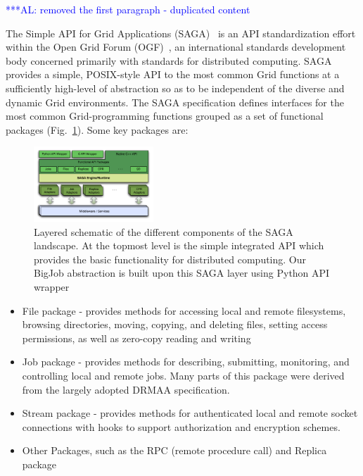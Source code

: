 \documentclass[conference,final]{IEEEtran}
\newcommand{\alnote}[1]{ {\textcolor{blue} { ***AL: #1 }}}
\newcommand{\alnote}[1]{}
\begin{document}
\alnote{removed the first paragraph - duplicated content}

The Simple API for Grid Applications (SAGA)~\cite{saga_url} is an API
standardization effort within the Open Grid Forum
(OGF)~\cite{saga_gfd90}, an international standards development body
concerned primarily with standards for distributed computing. SAGA
provides a simple, POSIX-style API to the most common Grid functions
at a sufficiently high-level of abstraction so as to be independent of
the diverse and dynamic Grid environments. The SAGA specification
defines interfaces for the most common Grid-programming functions
grouped as a set of functional packages (Fig.~\ref{Fig:SAGA1}). Some
key packages are:

\begin{figure}[!ht]
 \begin{center}
     \includegraphics[width=0.40\textwidth]{stci_saga_figures-1.pdf}
 \end{center}
\caption{\small Layered schematic of the different components of the
   SAGA landscape. At the topmost level is the simple integrated API
   which provides the basic functionality for distributed
   computing. Our BigJob abstraction is built upon this SAGA layer
   using Python API wrapper} \label{Fig:SAGA1}
\end{figure}

\begin{itemize}
\item File package - provides methods for accessing local and remote
 filesystems, browsing directories, moving, copying, and deleting
 files, setting access permissions, as well as zero-copy reading and
 writing
\item Job package - provides methods for describing, submitting,
 monitoring, and controlling local and remote jobs. Many parts of
 this package were derived from the largely adopted
 DRMAA %
 specification.
\item Stream package - provides methods for authenticated local and
 remote socket connections with hooks to support authorization and
 encryption schemes.
\item Other Packages, such as the RPC (remote procedure call) and Replica
 package
\end{itemize}
\end{document}
